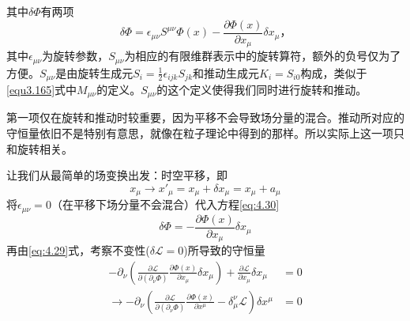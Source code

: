 其中$\delta\Phi$有两项
\begin{equation}
\delta\Phi = \epsilon_{\mu\nu}S^{\mu\nu}\Phi(x)-\frac{\partial\Phi(x)}{\partial x_\mu}\delta x_\mu \text{，}
\label{eq:4.30}
\end{equation}
其中$\epsilon_{\mu\nu}$为旋转参数，$S_{\mu\nu}$为相应的有限维群表示中的旋转算符，额外的负号仅为了方便。$S_{\mu\nu}$是由旋转生成元$S_{i}=\frac{1}{2}\epsilon_{ijk}S_{jk}$和推动生成元$K_i=S_{i0}$构成，类似于\ref{equ3.165}式中$M_{\mu\nu}$的定义。$S_{\mu\nu}$的这个定义使得我们同时进行旋转和推动。

第一项仅在旋转和推动时较重要，因为平移不会导致场分量的混合。推动所对应的守恒量依旧不是特别有意思，就像在粒子理论中得到的那样。所以实际上这一项只和旋转相关。

让我们从最简单的场变换出发：时空平移，即
\begin{equation}
x_\mu \rightarrow x'_\mu = x_\mu + \delta x_\mu = x_\mu + a_\mu
\label{eq:4.31}
\end{equation}
将$\epsilon_{\mu\nu}=0$（在平移下场分量不会混合）代入方程\ref{eq:4.30}
\[
\delta\Phi = -\frac{\partial\Phi(x)}{\partial x_\mu}\delta x_\mu
\]
再由\ref{eq:4.29}式，考察不变性($\delta{\mathscr L}=0$)所导致的守恒量
\begin{eqnarray}
-\partial_\nu\left(\frac{\partial\mathscr L}{\partial(\partial_\nu \Phi)}\frac{\partial\Phi(x)}{\partial x_\mu}\delta x_\mu\right) + \frac{\partial\mathscr L}{\partial x_\mu}\delta x_\mu &= 0 \\
\rightarrow -\partial_\nu\left(\frac{\partial\mathscr L}{\partial(\partial_\nu \Phi)}\frac{\partial\Phi(x)}{\partial x^\mu} - \delta_\mu^\nu{\mathscr L}\right) \delta x^\mu &= 0 \label{eq:4.33}
\end{eqnarray}

